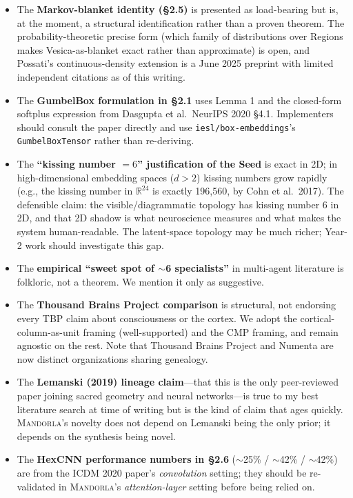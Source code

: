\documentclass[11pt,a4paper]{article}
\begin{document}
\begin{itemize}[leftmargin=*]
  \item The \textbf{Markov-blanket identity (\S 2.5)} is presented as load-bearing but is, at the moment, a structural identification rather than a proven theorem. The probability-theoretic precise form (which family of distributions over Regions makes Vesica-as-blanket exact rather than approximate) is open, and Possati's continuous-density extension is a June 2025 preprint with limited independent citations as of this writing.
  \item The \textbf{GumbelBox formulation in \S 2.1} uses Lemma 1 and the closed-form softplus expression from Dasgupta et al.\ NeurIPS 2020 \S 4.1. Implementers should consult the paper directly and use \texttt{iesl/box-embeddings}'s \texttt{GumbelBoxTensor} rather than re-deriving.
  \item The \textbf{``kissing number $= 6$'' justification of the Seed} is exact in 2D; in high-dimensional embedding spaces ($d > 2$) kissing numbers grow rapidly (e.g., the kissing number in $\mathbb{R}^{24}$ is exactly 196,560, by Cohn et al.\ 2017). The defensible claim: the visible/diagrammatic topology has kissing number 6 in 2D, and that 2D shadow is what neuroscience measures and what makes the system human-readable. The latent-space topology may be much richer; Year-2 work should investigate this gap.
  \item The \textbf{empirical ``sweet spot of $\sim$6 specialists''} in multi-agent literature is folkloric, not a theorem. We mention it only as suggestive.
  \item The \textbf{Thousand Brains Project comparison} is structural, not endorsing every TBP claim about consciousness or the cortex. We adopt the cortical-column-as-unit framing (well-supported) and the CMP framing, and remain agnostic on the rest. Note that Thousand Brains Project and Numenta are now distinct organizations sharing genealogy.
  \item The \textbf{Lemanski (2019) lineage claim}---that this is the only peer-reviewed paper joining sacred geometry and neural networks---is true to my best literature search at time of writing but is the kind of claim that ages quickly. \textsc{Mandorla}'s novelty does not depend on Lemanski being the only prior; it depends on the synthesis being novel.
  \item The \textbf{HexCNN performance numbers in \S 2.6} ($\sim$25\% / $\sim$42\% / $\sim$42\%) are from the ICDM 2020 paper's \emph{convolution} setting; they should be re-validated in \textsc{Mandorla}'s \emph{attention-layer} setting before being relied on.

\end{itemize}
\end{document}
